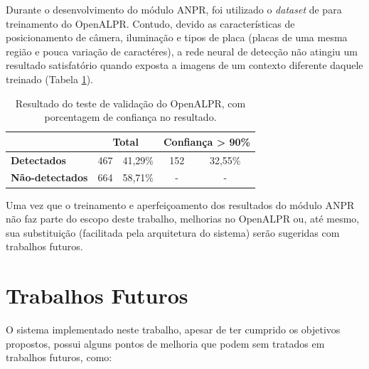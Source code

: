 \documentclass[12pt]{article}
\begin{document}
Durante o desenvolvimento do módulo ANPR, foi utilizado o \textit{dataset} de  para treinamento do OpenALPR. Contudo, devido as características de posicionamento de câmera, iluminação e tipos de placa (placas de uma mesma região e pouca variação de caractéres), a rede neural de detecção não atingiu um resultado satisfatório quando exposta a imagens de um contexto diferente daquele treinado (Tabela \ref{table:opelalpr-results}).

\begin{table}
	\centering
	\begin{tabular}{l|c|c|c|c} 
		\hline
		& \multicolumn{2}{c|}{\textbf{Total}} & \multicolumn{2}{c}{\textbf{Confiança \textgreater{} 90\%}}  \\ 
		\hline
		\textbf{Detectados}     & 467 & 41,29\%                       & 152 & 32,55\%                                               \\
		\textbf{Não-detectados} & 664 & 58,71\%                       & -   & -                                                     \\
		\hline
	\end{tabular}
	\caption{Resultado do teste de validação do OpenALPR, com porcentagem de confiança no resultado.}
	\label{table:opelalpr-results}
\end{table}

Uma vez que o treinamento e aperfeiçoamento dos resultados do módulo ANPR não faz parte do escopo deste trabalho, melhorias no OpenALPR ou, até mesmo, sua substituição (facilitada pela arquitetura do sistema) serão sugeridas com trabalhos futuros.

\section{Trabalhos Futuros}

O sistema implementado neste trabalho, apesar de ter cumprido os objetivos propostos, possui alguns pontos de melhoria que podem sem tratados em trabalhos futuros, como:
\end{document}
